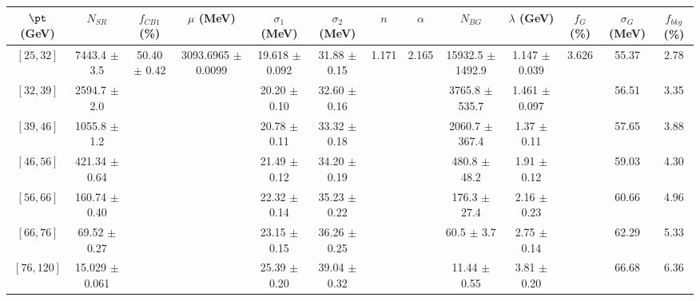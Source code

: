 \begin{tabular}{c||c|c|c|c|c|c|c|c|c|c|c||c}
$\pt$ (GeV) & $N_{SR}$ & $f_{CB1}$ (\%) & $\mu$ (MeV) & $\sigma_1$ (MeV) & $\sigma_2$ (MeV) & $n$ & $\alpha$ & $N_{BG}$ & $\lambda$ (GeV) & $f_G$ (\%) & $\sigma_G$ (MeV) & $f_{bkg}$ (\%) \\
\hline
$[25, 32]$ & 7443.4 $\pm$ 3.5 & \multirow{7}{*}{50.40 $\pm$ 0.42} & \multirow{7}{*}{3093.6965 $\pm$ 0.0099} & 19.618 $\pm$ 0.092 & 31.88 $\pm$ 0.15 & \multirow{7}{*}{1.171} & \multirow{7}{*}{2.165} & 15932.5 $\pm$ 1492.9 & 1.147 $\pm$ 0.039 & \multirow{7}{*}{3.626} & 55.37 & 2.78\\
$[32, 39]$ & 2594.7 $\pm$ 2.0 &  &  & 20.20 $\pm$ 0.10 & 32.60 $\pm$ 0.16 &  &  & 3765.8 $\pm$ 535.7 & 1.461 $\pm$ 0.097 &  & 56.51 & 3.35\\
$[39, 46]$ & 1055.8 $\pm$ 1.2 &  &  & 20.78 $\pm$ 0.11 & 33.32 $\pm$ 0.18 &  &  & 2060.7 $\pm$ 367.4 & 1.37 $\pm$ 0.11 &  & 57.65 & 3.88\\
$[46, 56]$ & 421.34 $\pm$ 0.64 &  &  & 21.49 $\pm$ 0.12 & 34.20 $\pm$ 0.19 &  &  & 480.8 $\pm$ 48.2 & 1.91 $\pm$ 0.12 &  & 59.03 & 4.30\\
$[56, 66]$ & 160.74 $\pm$ 0.40 &  &  & 22.32 $\pm$ 0.14 & 35.23 $\pm$ 0.22 &  &  & 176.3 $\pm$ 27.4 & 2.16 $\pm$ 0.23 &  & 60.66 & 4.96\\
$[66, 76]$ & 69.52 $\pm$ 0.27 &  &  & 23.15 $\pm$ 0.15 & 36.26 $\pm$ 0.25 &  &  & 60.5 $\pm$ 3.7 & 2.75 $\pm$ 0.14 &  & 62.29 & 5.33\\
$[76, 120]$ & 15.029 $\pm$ 0.061 &  &  & 25.39 $\pm$ 0.20 & 39.04 $\pm$ 0.32 &  &  & 11.44 $\pm$ 0.55 & 3.81 $\pm$ 0.20 &  & 66.68 & 6.36\\
\end{tabular}
